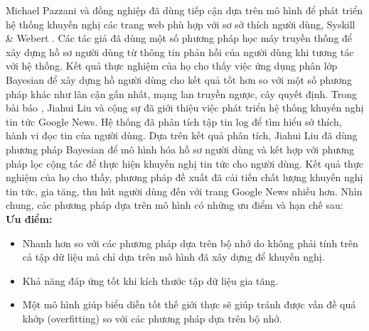 Michael Pazzani và đồng nghiệp đã dùng tiếp cận dựa trên mô hình để phát triển hệ thống khuyến nghị các trang web phù hợp với sơ sở thích người dùng, Syskill \& Webert \cite{PazzaniMB96}. Các tác giả đã dùng một số phương pháp học máy truyền thống để xây dựng hồ sơ người dùng từ thông tin phản hồi của người dùng khi tương tác với hệ thống. Kết quả thực nghiệm của họ cho thấy việc ứng dụng phân lớp Bayesian để xây dựng hồ người dùng cho kết quả tốt hơn so với một số phương pháp khác như lân cận gấn nhất, mạng lan truyền ngược, cây quyết định. Trong bài báo \cite{liu2010personalized}, Jiahui Liu và cộng sự đã giới thiệu việc phát triển hệ thống khuyến nghị tin tức Google News. Hệ thống đã phân tích tập tin log để tìm hiểu sở thích, hành vi đọc tin của người dùng. Dựa trên kết quả phân tích, Jiahui Liu đã dùng phương pháp Bayesian để mô hình hóa hồ sơ người dùng và kết hợp với phương pháp lọc cộng tác để thực hiện khuyến nghị tin tức cho người dùng. Kết quả thực nghiệm của họ cho thấy, phương pháp đề xuất đã cải tiến chất lượng khuyến nghị tin tức, gia tăng, thu hút người dùng đến với trang Google News nhiều hơn. Nhìn chung, các phương pháp dựa trên mô hình có những ưu điểm và hạn chế sau:\\
\textbf{Ưu điểm:}
\begin{itemize}
	\item Nhanh hơn so với các phương pháp dựa trên bộ nhớ do không phải tính trên cả tập dữ liệu mà chỉ dựa trên mô hình đã xây dựng để khuyến nghị.
	\item Khả năng đáp ứng tốt khi kích thước tập dữ liệu gia tăng.
	\item Một mô hình giúp biểu diễn tốt thế giới thực sẽ giúp tránh được vấn đề quá khớp (overfitting) so với các phương pháp dựa trên bộ nhớ.
\end{itemize}	
